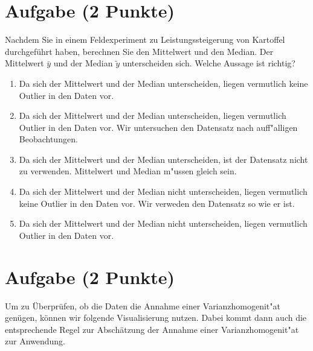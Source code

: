 \documentclass[a4paper, 9pt]{scrartcl}\usepackage[]{graphicx}\usepackage[]{xcolor}
\begin{document}
\section{Aufgabe \hfill (2 Punkte)}



Nachdem Sie in einem Feldexperiment zu Leistungssteigerung von
Kartoffel durchgef{\"u}hrt haben, berechnen Sie den Mittelwert und den
Median. Der Mittelwert $\bar{y}$ und der Median $\tilde{y}$
unterscheiden sich. Welche Aussage ist richtig?




\begin{enumerate}
\item [\textbf{A} \msquare] Da sich der Mittelwert und der Median unterscheiden, liegen vermutlich keine Outlier in den Daten vor.
\item [\textbf{B} \msquare] Da sich der Mittelwert und der Median unterscheiden, liegen vermutlich Outlier in den Daten vor. Wir untersuchen den Datensatz nach auff{"a}lligen Beobachtungen.
\item [\textbf{C} \msquare] Da sich der Mittelwert und der Median unterscheiden, ist der Datensatz nicht zu verwenden. Mittelwert und Median m{"u}ssen gleich sein.
\item [\textbf{D} \msquare] Da sich der Mittelwert und der Median nicht unterscheiden, liegen vermutlich keine Outlier in den Daten vor. Wir verweden den Datensatz so wie er ist.
\item [\textbf{E} \msquare] Da sich der Mittelwert und der Median nicht unterscheiden, liegen vermutlich Outlier in den Daten vor.
\end{enumerate}

\section{Aufgabe \hfill (2 Punkte)}



Um zu {\"U}berpr{\"u}fen, ob die Daten die Annahme einer Varianzhomogenit{"a}t gen{\"u}gen, k{\"o}nnen
wir folgende Visualisierung nutzen. Dabei kommt dann auch die entsprechende
Regel zur Absch{\"a}tzung der Annahme einer Varianzhomogenit{"a}t zur Anwendung. 
\end{document}
